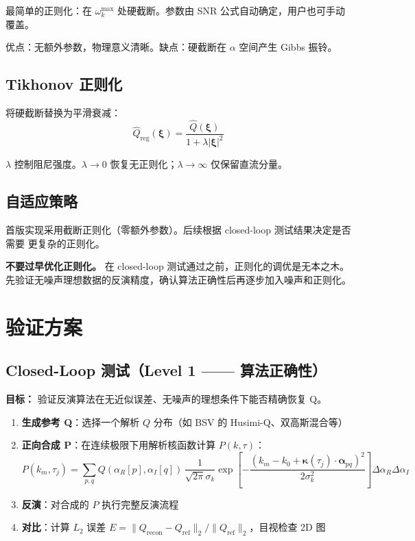 \documentclass[11pt,a4paper]{ctexart}
\begin{document}
最简单的正则化：在 $\omega_k^{\max}$ 处硬截断。参数由 SNR 公式自动确定，用户也可手动覆盖。

优点：无额外参数，物理意义清晰。缺点：硬截断在 $\alpha$ 空间产生 Gibbs 振铃。

\subsection{Tikhonov 正则化}

将硬截断替换为平滑衰减：
\[
\hat{Q}_{\text{reg}}(\boldsymbol{\xi}) = \frac{\hat{Q}(\boldsymbol{\xi})}
{1 + \lambda |\boldsymbol{\xi}|^2}
\]

$\lambda$ 控制阻尼强度。$\lambda \to 0$ 恢复无正则化；$\lambda \to \infty$ 仅保留直流分量。

\subsection{自适应策略}

首版实现采用截断正则化（零额外参数）。后续根据 closed-loop 测试结果决定是否需要
更复杂的正则化。

\begin{warnbox}
\textbf{不要过早优化正则化。} 在 closed-loop 测试通过之前，正则化的调优是无本之木。
先验证无噪声理想数据的反演精度，确认算法正确性后再逐步加入噪声和正则化。
\end{warnbox}

\section{验证方案}

\subsection{Closed-Loop 测试（Level 1 —— 算法正确性）}

\textbf{目标：} 验证反演算法在无近似误差、无噪声的理想条件下能否精确恢复 Q。

\begin{enumerate}
    \item \textbf{生成参考 Q}：选择一个解析 $Q$ 分布（如 BSV 的 Husimi-Q、双高斯混合等）
    \item \textbf{正向合成 P}：在连续极限下用解析核函数计算 $P(k,\tau)$：
        \[
        P(k_m,\tau_j) = \sum_{p,q} Q(\alpha_R[p],\alpha_I[q])\,
        \frac{1}{\sqrt{2\pi}\sigma_k}
        \exp\!\left[-\frac{(k_m - k_0 + \boldsymbol{\kappa}(\tau_j)\!\cdot\!\boldsymbol{\alpha}_{pq})^2}
        {2\sigma_k^2}\right] \Delta\alpha_R\Delta\alpha_I
        \]
    \item \textbf{反演}：对合成的 $P$ 执行完整反演流程
    \item \textbf{对比}：计算 $L_2$ 误差 $E = \|Q_{\text{recon}} - Q_{\text{ref}}\|_2 /
        \|Q_{\text{ref}}\|_2$，目视检查 2D 图
\end{enumerate}
\end{document}
